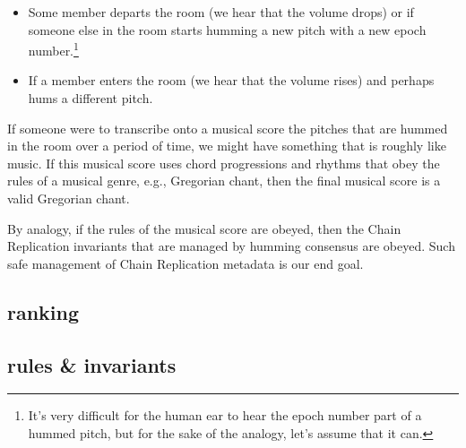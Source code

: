 \documentclass[preprint,10pt]{sigplanconf}
\begin{document}
\begin{itemize}
\item Some member departs the room (we hear that the volume drops) or
  if someone else in the room starts humming a
  new pitch with a new epoch number.\footnote{It's very difficult for
  the human ear to hear the epoch number part of a hummed pitch, but
  for the sake of the analogy, let's assume that it can.}
\item If a member enters the room (we hear that the volume rises) and
  perhaps hums a different pitch.
\end{itemize}

If someone were to transcribe onto a musical score the pitches that
are hummed in the room over a period of time, we might have something
that is roughly like music.  If this musical score uses chord progressions
and rhythms that obey the rules of a musical genre, e.g., Gregorian
chant, then the final musical score is a valid Gregorian chant.

By analogy, if the rules of the musical score are obeyed, then the
Chain Replication invariants that are managed by humming consensus are
obeyed.  Such safe management of Chain Replication metadata is our end goal.

\subsection{ranking}
\label{sub:projection-ranking}

\subsection{rules \& invariants}
\label{sub:humming-rules-and-invariants}
\end{document}
